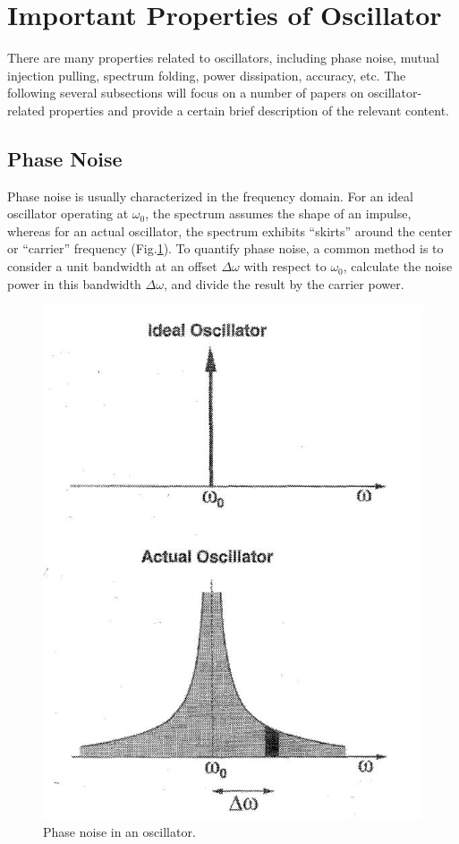 \documentclass[conference]{IEEEtran}
\begin{document}
\section{Important Properties of Oscillator}\label{sec3}
There are many properties related to oscillators, including phase noise, mutual injection pulling, spectrum folding, power dissipation, accuracy, etc. The following several subsections will focus on a number of papers on oscillator-related properties and provide a certain brief description of the relevant content.

\subsection{Phase Noise}\label{Phase Noise}
Phase noise is usually characterized in the frequency domain. For an ideal oscillator operating at $\omega_0$, the spectrum
assumes the shape of an impulse, whereas for an actual
oscillator, the spectrum exhibits “skirts” around the center
or “carrier” frequency (Fig.\ref{fig3-1}). To quantify phase noise, a common method is to consider a unit bandwidth at an offset $\Delta\omega$ with respect to $\omega_0$, calculate the noise power in this bandwidth $\Delta\omega$, and divide the result by the carrier power.

\begin{figure}[!h]
\centerline{\includegraphics[scale=0.25]{fig/pic3-1.jpg}}
\caption{Phase noise in an oscillator.\cite{b3}}
\label{fig3-1}
\end{figure}
\end{document}
